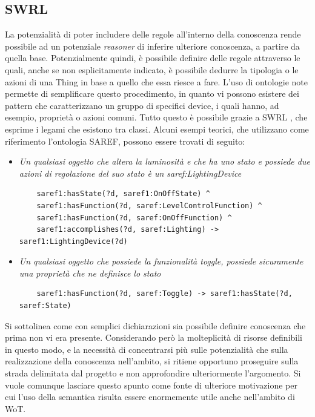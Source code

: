 \documentclass[12pt,a4paper,openright,oneside]{report}
\begin{document}
\subsection{SWRL}
La potenzialità di poter includere delle regole all'interno della conoscenza rende possibile ad un potenziale \textit{reasoner} di inferire ulteriore conoscenza, a partire da quella base. Potenzialmente quindi, è possibile definire delle regole attraverso le quali, anche se non esplicitamente indicato, è possibile dedurre la tipologia o le azioni di una Thing in base a quello che essa riesce a fare. L'uso di ontologie note permette di semplificare questo procedimento, in quanto vi possono esistere dei pattern che caratterizzano un gruppo di specifici device, i quali hanno, ad esempio, proprietà o azioni comuni. Tutto questo è possibile grazie a SWRL \cite{swrl}, che esprime i legami che esistono tra classi. Alcuni esempi teorici, che utilizzano come riferimento l'ontologia SAREF, possono essere trovati di seguito:

\begin{itemize}
	\item {\textit{Un qualsiasi oggetto che altera la luminosità e che ha uno stato e possiede due azioni di regolazione del suo stato è un \textit{saref:LightingDevice}}}
	\begin{lstlisting}
	saref1:hasState(?d, saref1:OnOffState) ^ 
	saref1:hasFunction(?d, saref:LevelControlFunction) ^ 
	saref1:hasFunction(?d, saref:OnOffFunction) ^
	saref1:accomplishes(?d, saref:Lighting) -> saref1:LightingDevice(?d)
	\end{lstlisting}

	\item {\textit{Un qualsiasi oggetto che possiede la funzionalità \textit{toggle}, possiede sicuramente una proprietà che ne definisce lo stato}}
	\begin{lstlisting}
	saref1:hasFunction(?d, saref:Toggle) -> saref1:hasState(?d, saref:State)
	\end{lstlisting}
\end{itemize}

Si sottolinea come con semplici dichiarazioni sia possibile definire conoscenza che prima non vi era presente. Considerando però la molteplicità di risorse definibili in questo modo, e la necessità di concentrarsi più sulle potenzialità che sulla realizzazione della conoscenza nell'ambito, si ritiene opportuno proseguire sulla strada delimitata dal progetto e non approfondire ulteriormente l'argomento. Si vuole comunque lasciare questo spunto come fonte di ulteriore motivazione per cui l'uso della semantica risulta essere enormemente utile anche nell'ambito di WoT.
\end{document}
